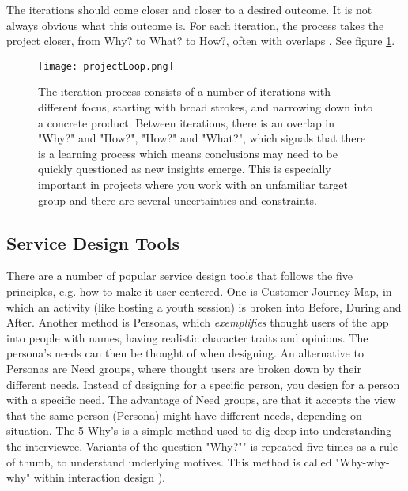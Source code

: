 The iterations should come closer and closer to a desired outcome. It is not always obvious what this outcome is. For each iteration, the process takes the project closer, from Why? to What? to How?, often with overlaps \citep{expedition-mondial}. See figure \ref{fig:iterationprocess}.


\begin{figure}[h]
    \centering
    \texttt{[image: projectLoop.png]}
    \caption{The iteration process consists of a number of iterations with different focus, starting with broad strokes, and narrowing down into a concrete product. Between iterations, there is an overlap in "Why?" and "How?", "How?" and "What?", which signals that there is a learning process which means conclusions may need to be quickly questioned as new insights emerge. This is especially important in projects where you work with an unfamiliar target group and there are several uncertainties and constraints.}
    \label{fig:iterationprocess}
\end{figure}

\subsection{Service Design Tools}

There are a number of popular service design tools that follows the five principles, e.g. how to make it user-centered. One is Customer Journey Map, in which an activity (like hosting a youth session) is broken into Before, During and After. Another method is Personas, which \textit{exemplifies} thought users of the app into people with names, having realistic character traits and opinions. The persona's needs can then be thought of when designing. An alternative to Personas are Need groups, where thought users are broken down by their different needs. Instead of designing for a specific person, you design for a person with a specific need. The advantage of Need groups, are that it accepts the view that the same person (Persona) might have different needs, depending on situation. The 5 Why's is a simple method used to dig deep into understanding the interviewee. Variants of the question "Why?"" is repeated five times as a rule of thumb, to understand underlying motives. This method is called "Why-why-why" within interaction design \citep{lowgren}).

